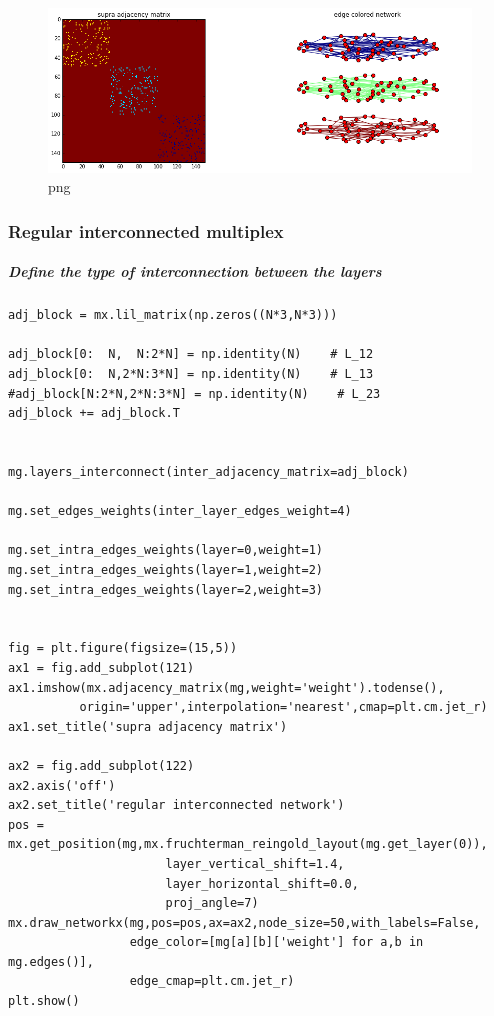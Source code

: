 \documentclass[]{article}
\begin{document}
\begin{figure}[htbp]
\centering
\includegraphics{output_46_0.png}
\caption{png}
\end{figure}

\subsubsection{Regular interconnected
multiplex}\label{regular-interconnected-multiplex}

\subparagraph{Define the type of interconnection between the
layers}\label{define-the-type-of-interconnection-between-the-layers}

\begin{verbatim}
adj_block = mx.lil_matrix(np.zeros((N*3,N*3)))

adj_block[0:  N,  N:2*N] = np.identity(N)    # L_12
adj_block[0:  N,2*N:3*N] = np.identity(N)    # L_13
#adj_block[N:2*N,2*N:3*N] = np.identity(N)    # L_23
adj_block += adj_block.T


mg.layers_interconnect(inter_adjacency_matrix=adj_block)

mg.set_edges_weights(inter_layer_edges_weight=4)

mg.set_intra_edges_weights(layer=0,weight=1)
mg.set_intra_edges_weights(layer=1,weight=2)
mg.set_intra_edges_weights(layer=2,weight=3)


fig = plt.figure(figsize=(15,5))
ax1 = fig.add_subplot(121)
ax1.imshow(mx.adjacency_matrix(mg,weight='weight').todense(),
          origin='upper',interpolation='nearest',cmap=plt.cm.jet_r)
ax1.set_title('supra adjacency matrix')

ax2 = fig.add_subplot(122)
ax2.axis('off')
ax2.set_title('regular interconnected network')
pos = mx.get_position(mg,mx.fruchterman_reingold_layout(mg.get_layer(0)),
                      layer_vertical_shift=1.4,
                      layer_horizontal_shift=0.0,
                      proj_angle=7)
mx.draw_networkx(mg,pos=pos,ax=ax2,node_size=50,with_labels=False,
                 edge_color=[mg[a][b]['weight'] for a,b in mg.edges()],
                 edge_cmap=plt.cm.jet_r)
plt.show()
\end{verbatim}
\end{document}
